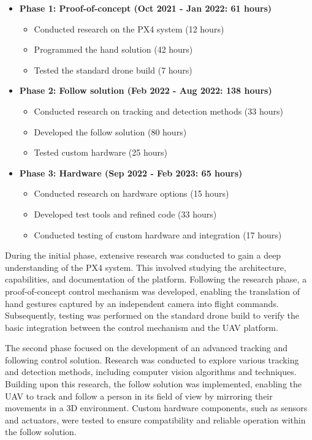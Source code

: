 \begin{itemize}
\item \textbf{Phase 1: Proof-of-concept (Oct 2021 - Jan 2022: 61 hours)}
\begin{itemize}
\item Conducted research on the PX4 system (12 hours)
\item Programmed the hand solution (42 hours)
\item Tested the standard drone build (7 hours)
\end{itemize}

\item \textbf{Phase 2: Follow solution (Feb 2022 - Aug 2022: 138 hours)}
\begin{itemize}
    \item Conducted research on tracking and detection methods (33 hours)
    \item Developed the follow solution (80 hours)
    \item Tested custom hardware (25 hours)
\end{itemize}

\item \textbf{Phase 3: Hardware (Sep 2022 - Feb 2023: 65 hours)}
\begin{itemize}
    \item Conducted research on hardware options (15 hours)
    \item Developed test tools and refined code (33 hours)
    \item Conducted testing of custom hardware and integration (17 hours)
\end{itemize}
\end{itemize}

During the initial phase, extensive research was conducted to gain a deep understanding of the PX4 system. This involved studying the architecture, capabilities, and documentation of the platform. Following the research phase, a proof-of-concept control mechanism was developed, enabling the translation of hand gestures captured by an independent camera into flight commands. Subsequently, testing was performed on the standard drone build to verify the basic integration between the control mechanism and the UAV platform.

The second phase focused on the development of an advanced tracking and following control solution. Research was conducted to explore various tracking and detection methods, including computer vision algorithms and techniques. Building upon this research, the follow solution was implemented, enabling the UAV to track and follow a person in its field of view by mirroring their movements in a 3D environment. Custom hardware components, such as sensors and actuators, were tested to ensure compatibility and reliable operation within the follow solution.

